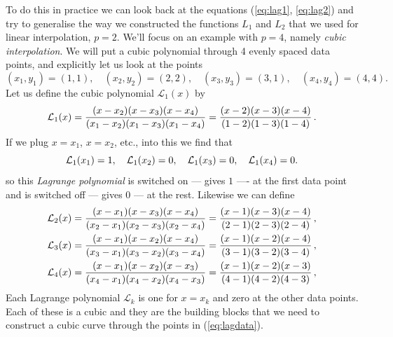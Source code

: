 To do this in practice we can look back at the equations (\ref{eq:lag1}, \ref{eq:lag2}) and try to generalise the way 
we constructed the functions $L_1$ and $L_2$ that we used for linear interpolation, $p=2$. We'll focus on an example with 
$p=4$, namely \emph{cubic interpolation}. We will put a cubic polynomial through 4 evenly spaced data points, and explicitly let us look at the 
points
%
\begin{equation}
(x_1,y_1) =(1,1), \quad 
(x_2,y_2) =(2,2), \quad
(x_3,y_3) =(3,1), \quad
(x_4,y_4) =(4,4). 
\label{eq:lagdata} 
\end{equation}
%
Let us define the cubic polynomial $\mathcal{L}_1 (x) $ by 
%
\begin{equation}
\mathcal{L}_1 (x) = \frac{(x-x_2)(x-x_3)(x-x_4)}{ (x_1-x_2)(x_1-x_3)(x_1-x_4)} =  \frac{(x-2)(x-3)(x-4)}{ (1-2)(1-3)(1-4)}\, . 
\notag
\end{equation}
%
If we plug $x=x_1$, $x = x_2$, etc., into this we find that
%
\begin{equation}
\mathcal{L}_1 (x_1) =1, \quad
\mathcal{L}_1 (x_2) =0, \quad
\mathcal{L}_1 (x_3) =0, \quad
\mathcal{L}_1 (x_4) =0. 
\notag
\end{equation}
%
so this \emph{Lagrange polynomial} is switched on --- gives $1$ ---- at the first data point and is switched off --- gives $0$ --- at the rest.
Likewise we can define 
%
\begin{align}
 &  \mathcal{L}_2 (x) = \frac{(x-x_1)(x-x_3)(x-x_4)}{ (x_2-x_1)(x_2-x_3)(x_2-x_4)} =  \frac{(x-1)(x-3)(x-4)}{ (2-1)(2-3)(2-4)}\, , \notag \\
 &  \mathcal{L}_3 (x) = \frac{(x-x_1)(x-x_2)(x-x_4)}{ (x_3-x_1)(x_3-x_2)(x_3-x_4)} =  \frac{(x-1)(x-2)(x-4)}{ (3-1)(3-2)(3-4)}\, ,  \notag\\
 &  \mathcal{L}_4 (x) = \frac{(x-x_1)(x-x_2)(x-x_3)}{ (x_4-x_1)(x_4-x_2)(x_4-x_3)} =  \frac{(x-1)(x-2)(x-3)}{ (4-1)(4-2)(4-3)}\, ,  \notag
\end{align}
%
%
Each Lagrange polynomial $\mathcal{L}_k$ is one for $x = x_k$ and zero at the other data points. Each of these is a cubic and they are the building 
blocks that we need to construct a cubic curve through the points in (\ref{eq:lagdata}). 

